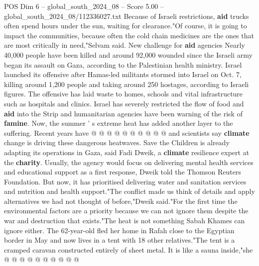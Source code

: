 \begin{textsample}{POS Dim 6 – global\_south\_2024\_08 – Score 5.00 – global\_south\_2024\_08/112336027.txt}
Because of Israeli restrictions, \textbf{aid} trucks often spend hours under the sun, waiting for clearance."Of course, it is going to impact the communities, because often the cold chain medicines are the ones that are most critically in need,"Selvam said.
New challenge for \textbf{aid} agencies Nearly 40,000 people have been killed and around 92,000 wounded since the Israeli army began its assault on Gaza, according to the Palestinian health ministry.
Israel launched its offensive after Hamas-led militants stormed into Israel on Oct. 7, killing around 1,200 people and taking around 250 hostages, according to Israeli figures.
The offensive has laid waste to homes, schools and vital infrastructure such as hospitals and clinics.
Israel has severely restricted the flow of food and \textbf{aid} into the Strip and humanitarian agencies have been warning of the risk of \textbf{famine}.
Now, the summer ' s extreme heat has added another layer to the suffering.
Recent years have @ @ @ @ @ @ @ @ @ @ and scientists say \textbf{climate} change is driving these dangerous heatwaves.
Save the Children is already adapting its operations in Gaza, said Fadi Dweik, a \textbf{climate} resilience expert at the \textbf{charity}.
Usually, the agency would focus on delivering mental health services and educational support as a first response, Dweik told the Thomson Reuters Foundation.
But now, it has prioritised delivering water and sanitation services and nutrition and health support."The conflict made us think of details and apply alternatives we had not thought of before,"Dweik said."For the first time the environmental factors are a priority because we can not ignore them despite the war and destruction that exists."The heat is not something Sabah Khames can ignore either.
The 62-year-old fled her home in Rafah close to the Egyptian border in May and now lives in a tent with 18 other relatives."The tent is a cramped caravan constructed entirely of sheet metal.
It is like a sauna inside,"she @ @ @ @ @ @ @ @ @ @

\end{textsample}
